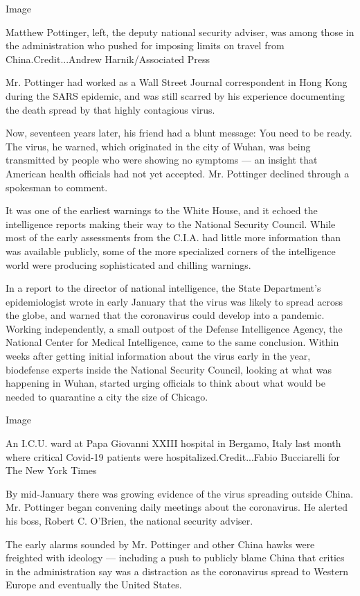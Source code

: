 Image

Matthew Pottinger, left, the deputy national security adviser, was among
those in the administration who pushed for imposing limits on travel
from China.Credit...Andrew Harnik/Associated Press

Mr. Pottinger had worked as a Wall Street Journal correspondent in Hong
Kong during the SARS epidemic, and was still scarred by his experience
documenting the death spread by that highly contagious virus.

Now, seventeen years later, his friend had a blunt message: You need to
be ready. The virus, he warned, which originated in the city of Wuhan,
was being transmitted by people who were showing no symptoms --- an
insight that American health officials had not yet accepted. Mr.
Pottinger declined through a spokesman to comment.

It was one of the earliest warnings to the White House, and it echoed
the intelligence reports making their way to the National Security
Council. While most of the early assessments from the C.I.A. had little
more information than was available publicly, some of the more
specialized corners of the intelligence world were producing
sophisticated and chilling warnings.

In a report to the director of national intelligence, the State
Department's epidemiologist wrote in early January that the virus was
likely to spread across the globe, and warned that the coronavirus could
develop into a pandemic. Working independently, a small outpost of the
Defense Intelligence Agency, the National Center for Medical
Intelligence, came to the same conclusion. Within weeks after getting
initial information about the virus early in the year, biodefense
experts inside the National Security Council, looking at what was
happening in Wuhan, started urging officials to think about what would
be needed to quarantine a city the size of Chicago.

Image

An I.C.U. ward at Papa Giovanni XXIII hospital in Bergamo, Italy last
month where critical Covid-19 patients were hospitalized.Credit...Fabio
Bucciarelli for The New York Times

By mid-January there was growing evidence of the virus spreading outside
China. Mr. Pottinger began convening daily meetings about the
coronavirus. He alerted his boss, Robert C. O'Brien, the national
security adviser.

The early alarms sounded by Mr. Pottinger and other China hawks were
freighted with ideology --- including a push to publicly blame China
that critics in the administration say was a distraction as the
coronavirus spread to Western Europe and eventually the United States.

